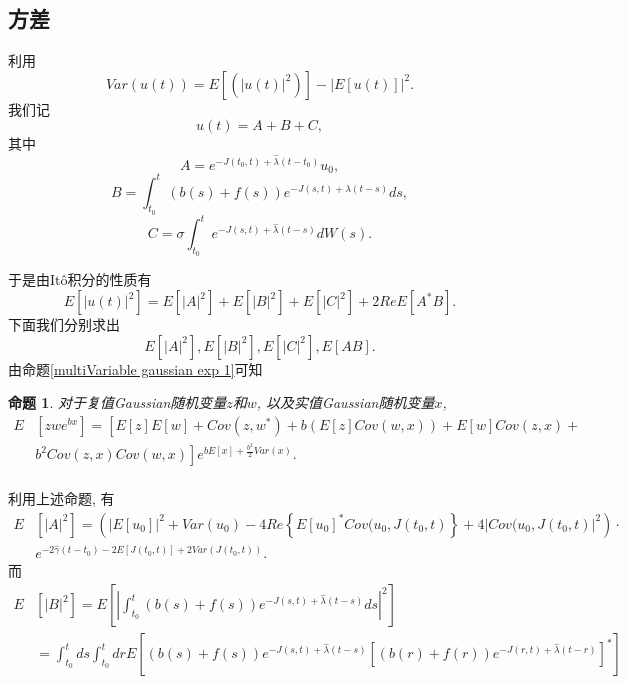 \documentclass[notitlepage,cs4size,punct,oneside]{ctexrep}
\numberwithin{equation}{section}
\theoremstyle{mystyle}
\newtheorem{proposition}[definition]{\hspace{2em}命题}
\begin{document}
\subsection{方差}
利用
\begin{equation}
Var(u(t)) = E\left[(|u(t)|^2)\right] - \left|E[u(t)]\right|^2.
\end{equation}
我们记
\begin{equation}
u(t) = A + B + C,
\end{equation}
其中
\begin{equation}
A = e^{-J(t_0, t)+\hat{\lambda}(t-t_0)}u_0,
\end{equation}
\begin{equation}
B = \int_{t_0}^t (b(s)+f(s))e^{-J(s, t)+\hat{\lambda}(t-s)}ds,
\end{equation}
\begin{equation}
C = \sigma\int_{t_0}^t e^{-J(s, t)+\hat{\lambda}(t-s)}dW(s).
\end{equation}

于是由It\^{o}积分的性质有
\begin{equation} \label{E u(t)^2}
E\left[|u(t)|^2\right] = E\left[|A|^2\right]+ E\left[|B|^2\right] + E\left[|C|^2\right] + 2Re{E[A^*B]}.
\end{equation}
下面我们分别求出
$$
E\left[|A|^2\right], E\left[|B|^2\right], E\left[|C|^2\right], E[AB].
$$
由命题\ref{multiVariable gaussian exp 1}可知
\begin{proposition}  \label{multiVariable gaussian exp 3} 对于复值Gaussian随机变量$z$和$w$, 以及实值Gaussian随机变量$x$,
\begin{equation}
\begin{split}
E&\left[zwe^{bx}\right] = \left[E[z]E[w]+Cov(z, w^*)+b(E[z]Cov(w, x))+E[w]Cov(z, x)+ \right. \\
& \left.b^2Cov(z, x)Cov(w, x)\right]e^{bE[x]+\frac{b^2}{2}Var(x)}. \\
\end{split}
\end{equation}
\end{proposition}

利用上述命题, 有
\begin{equation}
\begin{split}
E&\left[|A|^2\right] = \left(|E[u_0]|^2 +Var(u_0) - 4Re\left\{E[u_0]^*Cov(u_0, J(t_0, t)\right\} +4|Cov(u_0, J(t_0, t)|^2\right) \cdot \\
& e^{-2\hat{\gamma}(t-t_0)-2E[J(t_0, t)]+2Var(J(t_0, t))}.
\end{split}
\end{equation}
而
\begin{equation}
\begin{split}
E&\left[|B|^2\right] = E\left[\left|\int_{t_0}^t (b(s)+f(s))e^{-J(s, t)+\hat{\lambda}(t-s)}ds\right|^2\right] \\
&= \int_{t_0}^t ds\int_{t_0}^t dr E\left[(b(s)+f(s))e^{-J(s, t)+\hat{\lambda}(t-s)}\left[(b(r)+f(r))e^{-J(r, t)+\hat{\lambda}(t-r)}\right]^*\right]
\end{split}
\end{equation}
\end{document}
